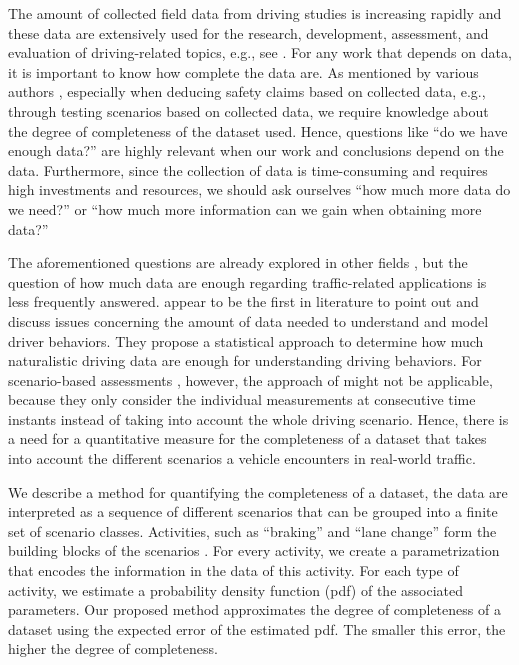 The amount of collected field data from driving studies is increasing rapidly and these data are extensively used for the research, development, assessment, and evaluation of driving-related topics, e.g., see \textcite{dingus2016crashrisk, klauer2006impact, williamson2011link, sadigh2014data, broggi2013extensive, zofka2015datadrivetrafficscenarios, elrofai2018scenario, deGelder2017assessment, ploeg2018cetran, putz2017pegasus, krajewski2018highD}. For any work that depends on data, it is important to know how complete the data are. As mentioned by various authors \cite{geyer2014, stellet2015taxonomy, alvarez2017prospective}, especially when deducing safety claims based on collected data, e.g., through testing scenarios based on collected data, we require knowledge about the degree of completeness of the dataset used. Hence, questions like ``do we have enough data?'' are highly relevant when our work and conclusions depend on the data. Furthermore, since the collection of data is time-consuming and requires high investments and resources, we should ask ourselves ``how much more data do we need?'' or ``how much more information can we gain when obtaining more data?''

The aforementioned questions are already explored in other fields \cite{guest2006many, blair2004evolution, marks2018howmuch, yang2012estimating, wang2017much}, but the question of how much data are enough regarding traffic-related applications is less frequently answered. \textcite{wang2017much} appear to be the first in literature to point out and discuss issues concerning the amount of data needed to understand and model driver behaviors. They propose a statistical approach to determine how much naturalistic driving data are enough for understanding driving behaviors. 
For scenario-based assessments \cite{stellet2015taxonomy, alvarez2017prospective, elrofai2018scenario, ploeg2018cetran, geyer2014}, however, the approach of \textcite{wang2017much} might not be applicable, because they only consider the individual measurements at consecutive time instants instead of taking into account the whole driving scenario. Hence, there is a need for a quantitative measure for the completeness of a dataset that takes into account the different scenarios a vehicle encounters in real-world traffic.

We describe a method for quantifying the completeness of a dataset, the data are interpreted as a sequence of different scenarios that can be grouped into a finite set of scenario classes. Activities, such as ``braking'' and ``lane change'' form the building blocks of the scenarios \cite{elrofai2018scenario}. For every activity, we create a parametrization that encodes the information in the data of this activity. For each type of activity, we estimate a probability density function (pdf) of the associated parameters. Our proposed method approximates the degree of completeness of a dataset using the expected error of the estimated pdf. The smaller this error, the higher the degree of completeness.

